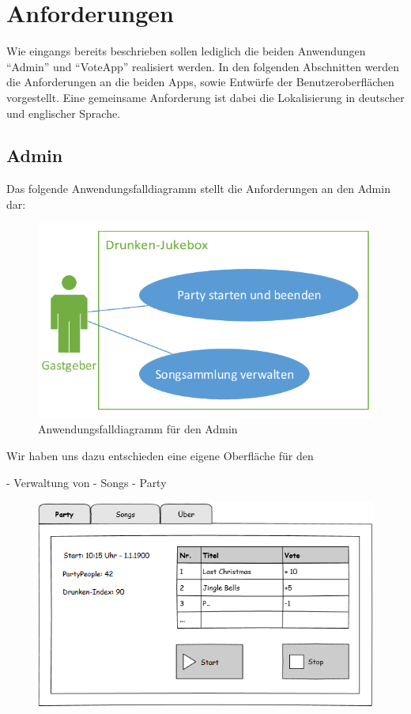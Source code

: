 \section{Anforderungen}
Wie eingangs bereits beschrieben sollen lediglich die beiden Anwendungen "`Admin"' und "`VoteApp"' realisiert werden. In den folgenden Abschnitten werden die Anforderungen an die beiden Apps, sowie Entwürfe der Benutzeroberflächen vorgestellt. Eine gemeinsame Anforderung ist dabei die Lokalisierung in deutscher und englischer Sprache.

\subsection{Admin}
Das folgende Anwendungsfalldiagramm stellt die Anforderungen an den Admin dar:

\begin{figure}[H]
\centering
\includegraphics[width=0.7\linewidth]{Bilder/AdminUseCase}
\caption{Anwendungsfalldiagramm für den Admin}
\label{fig:AdminUseCase}
\end{figure}



Wir haben uns dazu entschieden eine eigene Oberfläche für den 



- Verwaltung von
  - Songs
  - Party
  
\begin{figure}[H]
\centering
\includegraphics[width=0.95\linewidth]{Bilder/MockParty}
\caption{}
\label{fig:MockParty}
\end{figure}


